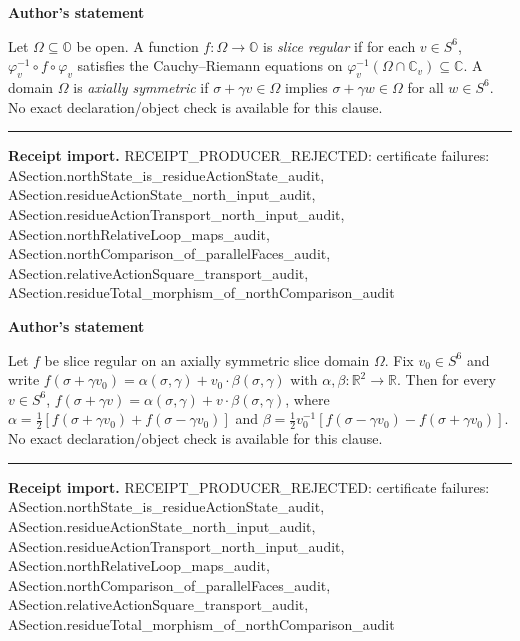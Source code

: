 \documentclass[11pt]{article}
\newcommand{\OO}{\mathbb{O}}
\newcommand{\CC}{\mathbb{C}}
\newcommand{\RR}{\mathbb{R}}
\theoremstyle{plain}
\theoremstyle{definition}
\theoremstyle{remark}
\begin{document}
\begin{tcolorbox}[provenancecard,title={12. Definition - Slice regularity; \{\textbackslash{}cite[Def.\textasciitilde{}5.1.1]\{CSS12\}\}},title after break={12. Definition - Slice regularity; \{\textbackslash{}cite[Def.\textasciitilde{}5.1.1]\{CSS12\}\} (continued)}]
\textbf{Author's statement}\par
Let $\Omega\subseteq\OO$ be open. A function $f:\Omega\to\OO$ is \emph{slice regular}
if for each $v\in S^6$, $\varphi_v^{-1}\circ f\circ\varphi_v$ satisfies the
Cauchy--Riemann equations on $\varphi_v^{-1}(\Omega\cap\CC_v)\subseteq\CC$. A domain
$\Omega$ is \emph{axially symmetric} if $\sigma+\gamma v\in\Omega$ implies
$\sigma+\gamma w\in\Omega$ for all $w\in S^6$.
\tcblower
\textcolor{KgtRed}{No exact declaration/object check is available for this clause.}
\medskip\hrule\medskip
\textbf{Receipt import.} \textcolor{KgtRed}{RECEIPT\_PRODUCER\_REJECTED: certificate failures: ASection.northState\_is\_residueActionState\_audit, ASection.residueActionState\_north\_input\_audit, ASection.residueActionTransport\_north\_input\_audit, ASection.northRelativeLoop\_maps\_audit, ASection.northComparison\_of\_parallelFaces\_audit, ASection.relativeActionSquare\_transport\_audit, ASection.residueTotal\_morphism\_of\_northComparison\_audit}
\end{tcolorbox}
\medskip
\begin{tcolorbox}[provenancecard,title={13. Theorem - Representation Formula; \{\textbackslash{}cite[Thm.\textasciitilde{}5.1.7]\{CSS12\}\}},title after break={13. Theorem - Representation Formula; \{\textbackslash{}cite[Thm.\textasciitilde{}5.1.7]\{CSS12\}\} (continued)}]
\textbf{Author's statement}\par
Let $f$ be slice regular on an axially symmetric slice domain $\Omega$. Fix
$v_0\in S^6$ and write $f(\sigma+\gamma v_0)=\alpha(\sigma,\gamma)+v_0\cdot\beta(\sigma,\gamma)$
with $\alpha,\beta:\RR^2\to\RR$. Then for every $v\in S^6$,
$f(\sigma+\gamma v)=\alpha(\sigma,\gamma)+v\cdot\beta(\sigma,\gamma)$, where
$\alpha=\tfrac12[f(\sigma+\gamma v_0)+f(\sigma-\gamma v_0)]$ and
$\beta=\tfrac12 v_0^{-1}[f(\sigma-\gamma v_0)-f(\sigma+\gamma v_0)]$.
\tcblower
\textcolor{KgtRed}{No exact declaration/object check is available for this clause.}
\medskip\hrule\medskip
\textbf{Receipt import.} \textcolor{KgtRed}{RECEIPT\_PRODUCER\_REJECTED: certificate failures: ASection.northState\_is\_residueActionState\_audit, ASection.residueActionState\_north\_input\_audit, ASection.residueActionTransport\_north\_input\_audit, ASection.northRelativeLoop\_maps\_audit, ASection.northComparison\_of\_parallelFaces\_audit, ASection.relativeActionSquare\_transport\_audit, ASection.residueTotal\_morphism\_of\_northComparison\_audit}
\end{tcolorbox}
\end{document}
